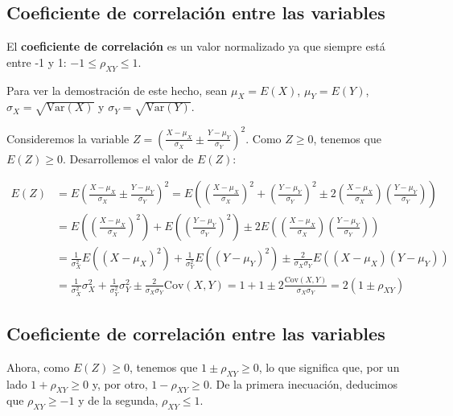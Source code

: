 \documentclass[]{book}
\begin{document}
\hypertarget{coeficiente-de-correlaciuxf3n-entre-las-variables-3}{%
\subsection{Coeficiente de correlación entre las variables}\label{coeficiente-de-correlaciuxf3n-entre-las-variables-3}}

El \textbf{coeficiente de correlación} es un valor normalizado ya que siempre está entre -1 y 1: \(-1\leq\rho_{XY}\leq 1\).

Para ver la demostración de este hecho, sean \(\mu_X=E(X)\), \(\mu_Y=E(Y)\), \(\sigma_X=\sqrt{\mathrm{Var}(X)}\) y \(\sigma_Y=\sqrt{\mathrm{Var}(Y)}\).

Consideremos la variable \(Z=\left(\frac{X-\mu_X}{\sigma_X}\pm \frac{Y-\mu_Y}{\sigma_Y}\right)^2\). Como \(Z\geq 0\), tenemos que \(E(Z)\geq 0\). Desarrollemos el valor de \(E(Z)\):

\[
\begin{array}{rl}
E(Z) & = E\left(\frac{X-\mu_X}{\sigma_X}\pm \frac{Y-\mu_Y}{\sigma_Y}\right)^2 = E\left(\left(\frac{X-\mu_X}{\sigma_X}\right)^2+\left(\frac{Y-\mu_Y}{\sigma_Y}\right)^2\pm 2\left(\frac{X-\mu_X}{\sigma_X}\right) \left(\frac{Y-\mu_Y}{\sigma_Y}\right)\right) \\ & =
E\left(\left(\frac{X-\mu_X}{\sigma_X}\right)^2\right)+E\left(\left(\frac{Y-\mu_Y}{\sigma_Y}\right)^2\right)\pm 2 E\left(\left(\frac{X-\mu_X}{\sigma_X}\right) \left(\frac{Y-\mu_Y}{\sigma_Y}\right)\right) \\ & =
\frac{1}{\sigma_X^2}E\left(\left(X-\mu_X\right)^2\right)+\frac{1}{\sigma_Y^2}E\left(\left(Y-\mu_Y\right)^2\right)\pm \frac{2}{\sigma_X\sigma_Y}E\left(\left(X-\mu_X\right) \left(Y-\mu_Y\right)\right) \\ & = \frac{1}{\sigma_X^2}\sigma_X^2+
\frac{1}{\sigma_Y^2}\sigma_Y^2 \pm\frac{2}{\sigma_X\sigma_Y} \mathrm{Cov}(X,Y) = 1+1\pm 2\frac{\mathrm{Cov}(X,Y)}{\sigma_X\sigma_Y}=2(1\pm\rho_{XY})
\end{array}
\]

\hypertarget{coeficiente-de-correlaciuxf3n-entre-las-variables-4}{%
\subsection{Coeficiente de correlación entre las variables}\label{coeficiente-de-correlaciuxf3n-entre-las-variables-4}}

Ahora, como \(E(Z)\geq 0\), tenemos que \(1\pm \rho_{XY}\geq 0\), lo que significa que, por un lado \(1+\rho_{XY}\geq 0\) y, por otro, \(1-\rho_{XY}\geq 0\). De la primera inecuación, deducimos que \(\rho_{XY}\geq -1\) y de la segunda, \(\rho_{XY}\leq 1\).
\end{document}
